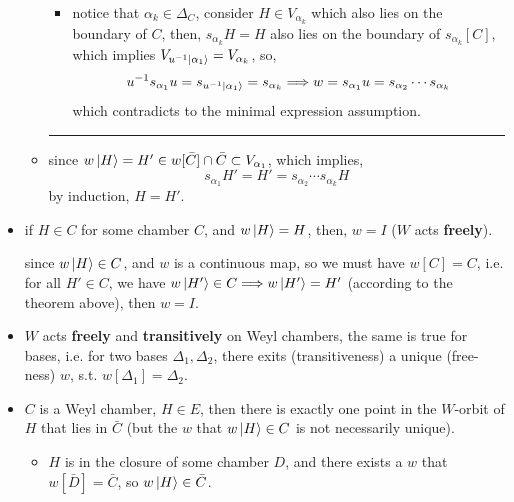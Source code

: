 \begin{itemize}
\begin{tcolorbox}[title=proof:]
\begin{itemize}
\begin{itemize}
				\item notice that $\alpha_k \in \Delta_C$, consider $H \in V_{\alpha_k}$ which also lies on the boundary of $C$, then, $s_{\alpha_k} H = H$ also lies on the boundary of $s_{\alpha_k}[C]$, which implies $V_{u^{- 1} \ket{\alpha_1}} = V_{\alpha_k}$, so,
				\begin{equation}
					u^{- 1} s_{\alpha_1} u = s_{u^{- 1} \ket{\alpha_1}} = s_{\alpha_k} \Longrightarrow w = s_{\alpha_1} u = s_{\alpha_2} \cdots s_{\alpha_k}
				\end{equation}
				which contradicts to the minimal expression assumption.
			\end{itemize}
			
			\noindent\rule[0.5ex]{\linewidth}{0.5pt} %
			
			\item since $w \ket{H} = H' \in w[\bar{C}] \cap \bar{C} \subset V_{\alpha_1}$, which implies,
			\begin{equation}
				s_{\alpha_1} H' = H' = s_{\alpha_2} \cdots s_{\alpha_k} H
			\end{equation}
			by induction, $H = H'$.
		\end{itemize}
	\end{tcolorbox}
	
	\item if $H \in C$ for some chamber $C$, and $w \ket{H} = H$, then, $w = I$ ($W$ acts \textbf{freely}).
	
	\begin{tcolorbox}[title=proof:]
		since $w \ket{H} \in C$, and $w$ is a continuous map, so we must have $w[C] = C$, i.e. for all $H' \in C$, we have $w \ket{H'} \in C \Longrightarrow w \ket{H'} = H'$ (according to the theorem above), then $w = I$.
	\end{tcolorbox}
	
	\item $W$ acts \textbf{freely} and \textbf{transitively} on Weyl chambers, the same is true for bases, i.e. for two bases $\Delta_1, \Delta_2$, there exits (transitiveness) a unique (free-ness) $w$, s.t. $w[\Delta_1] = \Delta_2$.
	
	\item $C$ is a Weyl chamber, $H \in E$, then there is exactly one point in the $W$-orbit of $H$ that lies in $\bar{C}$ (but the $w$ that $w \ket{H} \in C$ is not necessarily unique).
	
	\begin{tcolorbox}[title=proof:]
		\begin{itemize}
			\item $H$ is in the closure of some chamber $D$, and there exists a $w$ that $w[\bar{D}] = \bar{C}$, so $w \ket{H} \in \bar{C}$.
			

\end{itemize}
\end{tcolorbox}
\end{itemize}
